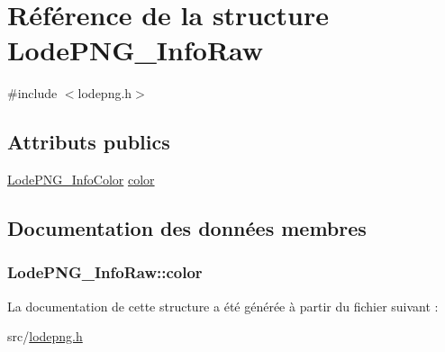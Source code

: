 \hypertarget{struct_lode_p_n_g___info_raw}{}\section{Référence de la structure Lode\+P\+N\+G\+\_\+\+Info\+Raw}
\label{struct_lode_p_n_g___info_raw}


{\ttfamily \#include $<$lodepng.\+h$>$}

\subsection*{Attributs publics}
\begin{DoxyCompactItemize}
\item 
\hyperlink{struct_lode_p_n_g___info_color}{Lode\+P\+N\+G\+\_\+\+Info\+Color} \hyperlink{struct_lode_p_n_g___info_raw_ae9fa1c020358980be41f861ab71589fb}{color}
\end{DoxyCompactItemize}


\subsection{Documentation des données membres}
\hypertarget{struct_lode_p_n_g___info_raw_ae9fa1c020358980be41f861ab71589fb}{}
\subsubsection[{color}]{ Lode\+P\+N\+G\+\_\+\+Info\+Raw\+::color}\label{struct_lode_p_n_g___info_raw_ae9fa1c020358980be41f861ab71589fb}


La documentation de cette structure a été générée à partir du fichier suivant \+:\begin{DoxyCompactItemize}
\item 
src/\hyperlink{lodepng_8h}{lodepng.\+h}\end{DoxyCompactItemize}
